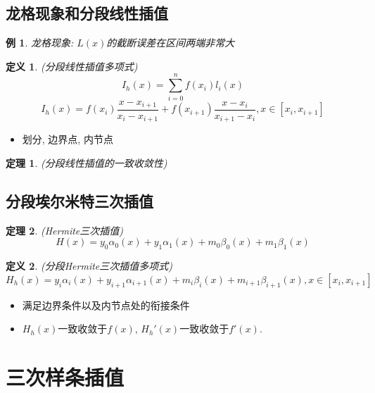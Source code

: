 \documentclass[twoside]{article}
\newtheorem{theorem}{定理}[section]
\newtheorem{definition}{定义}[section]
\newtheorem{eg}{例}[section]
\begin{document}
\subsection{龙格现象和分段线性插值}
\begin{eg}
  龙格现象: $L(x)$的截断误差在区间两端非常大
\end{eg}
\begin{definition}
  (分段线性插值多项式)
  \begin{equation}
    I_h(x)=\sum^n_{i=0} f(x_i) l_i(x)
  \end{equation}
  \begin{equation}
    I_h (x) = f(x_i) \frac{x-x_{i+1}}{x_i-x_{i+1}} + f(x_{i+1})\frac{x-x_i}{x_{i+1}-x_i}, x\in[x_i, x_{i+1}]
  \end{equation}
\end{definition}
\begin{itemize}
  \item 划分, 边界点, 内节点
\end{itemize}
\begin{theorem}
  (分段线性插值的一致收敛性)
\end{theorem}
\subsection{分段埃尔米特三次插值}
\begin{theorem}
  (Hermite三次插值)
  \begin{equation}
    H(x) = y_0 \alpha_0(x) + y_1 \alpha_1(x) + m_0 \beta_0(x) + m_1\beta_1(x)
  \end{equation}
\end{theorem}
\begin{definition}
  (分段Hermite三次插值多项式)
  \begin{equation}
    H_h(x) = y_i \alpha_i(x) + y_{i+1} \alpha_{i+1}(x) + m_i \beta_i(x) + m_{i+1}\beta_{i+1}(x), x\in[x_i, x_{i+1}]
  \end{equation}
\end{definition}
\begin{itemize}
  \item 满足边界条件以及内节点处的衔接条件
  \item $H_h(x)$一致收敛于$f(x)$, $H_h'(x)$一致收敛于$f'(x)$.
\end{itemize}

\section{三次样条插值}
\end{document}
